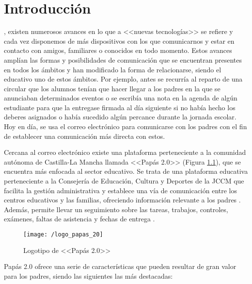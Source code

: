 \chapter{Introducción}
\label{chap:intro}

, existen numerosos avances en lo que a <<nuevas tecnologías>> se refiere y cada vez disponemos de más dispositivos con los que comunicarnos y estar en contacto con amigos, familiares o conocidos en todo momento. Estos avances amplían las formas y posibilidades de comunicación que se encuentran presentes en todos los ámbitos y han modificado la forma de relacionarse, siendo el educativo uno de estos ámbitos. Por ejemplo, antes se recurría al reparto de una circular que los alumnos tenían que hacer llegar a los padres en la que se anunciaban determinados eventos o se escribía una nota en la agenda de algún estudiante para que la entregase firmada al día siguiente si no había hecho los deberes asignados o había sucedido algún percance durante la jornada escolar. Hoy en día, se usa el correo electrónico para comunicarse con los padres con el fin de establecer una comunicación más directa con estos.

Cercana al correo electrónico existe una plataforma perteneciente a la comunidad autónoma de Castilla-La Mancha llamada <<Papás 2.0>> (Figura \ref{fig:papas20}), que se encuentra más enfocada al sector educativo. Se trata de una plataforma educativa perteneciente a la Consejería de Educación, Cultura y Deportes de la \acf{JCCM} que facilita la gestión administrativa y establece una vía de comunicación entre los centros educativos y las familias, ofreciendo información relevante a los padres \cite{JCCM2017}. Además, permite llevar un seguimiento sobre las tareas, trabajos, controles, exámenes, faltas de asistencia y fechas de entrega \cite{JCCM2010}.

\begin{figure}[!h]
	\begin{center}
		\texttt{[image: /logo\_papas\_20]}
		\caption{Logotipo de <<Papás 2.0>>}
		\label{fig:papas20}
	\end{center}
\end{figure}

\newpage

Papás 2.0 ofrece una serie de características que pueden resultar de gran valor para los padres, siendo las siguientes las más destacadas:

